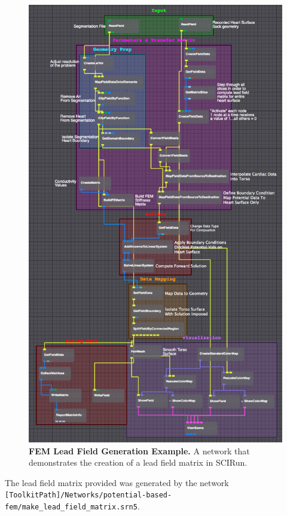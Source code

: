 \begin{figure}[H]
\vspace{-.25in}
\begin{center}
\includegraphics[width=.75\textwidth]{ECGToolkitGuide_figures/FEMLead.png}
\caption{{\bf FEM Lead Field Generation Example.} A network that demonstrates the creation of a lead field matrix in SCIRun.}
\label{fig:FEMLead}
\end{center}
\vspace{-.25in}
\end{figure}
\noindent
The lead field matrix provided was generated by the network \newline
{\tt [ToolkitPath]/Networks/potential-based-fem/make\_lead\_field\_matrix.srn5}.

